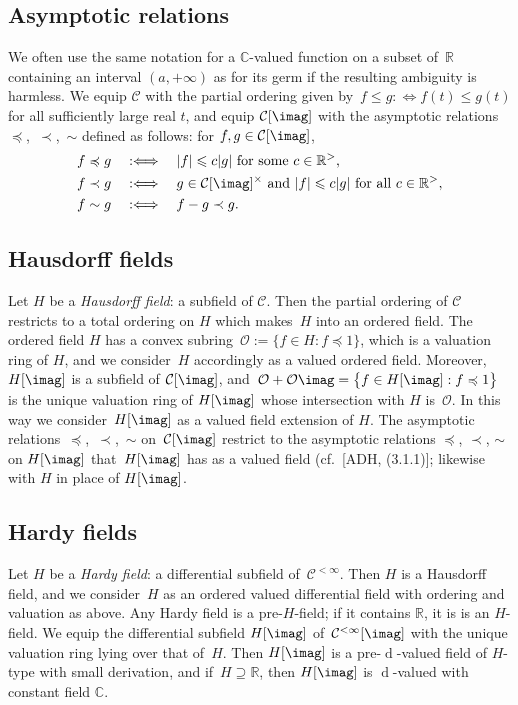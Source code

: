 \documentclass[]{amsart}
\numberwithin{equation}{section}
\newcommand{\bbold}{\mathbb}
\def\R { {\bbold R} }
\def\C { {\bbold C} }
\def\c {\mathcal{C}}
\def \d{\operatorname{d}}
\theoremstyle{definition}
\theoremstyle{remark}
\newcommand{\abs}[1]{\lvert#1\rvert}
\renewcommand\leq{\leqslant}
\renewcommand\preceq{\preccurlyeq}
\renewcommand\le{\leq}
\def \Gi{\mathcal{C}^{<\infty}}
\def \Calinf{\mathcal{C}^{<\infty}}
\begin{document}
\subsection*{Asymptotic relations}
We often use the same notation for a $\C$-valued function 
on a subset of~$\R$ containing an interval $(a, +\infty)$   as for its germ if the resulting ambiguity is harmless.
We equip $\c$ with the partial ordering given by~$f\leq g:\Leftrightarrow f(t)\leq g(t)$ for all sufficiently large real $t$,
and equip $\c[\imag]$ with the asymptotic relations~$\preceq$,~$\prec$,~$\sim$ defined as follows: for $f,g\in \c[\imag]$,
\begin{align*} f\preceq g\quad &:\Longleftrightarrow\quad \text{$|f|\le c|g|$ for some  $c\in \R^{>}$,}\\
f\prec g\quad &:\Longleftrightarrow\quad   \text{$g\in \c[\imag]^\times$ and $\abs{f}\leq c\abs{g}$ for all $c\in\R^>$},\\
f\sim g\quad &:\Longleftrightarrow\quad   f-g\prec g.
\end{align*}

\subsection*{Hausdorff fields}
Let   $H$ be a {\it Hausdorff field}\/:
a subfield of $\mathcal C$. 
Then the partial ordering of $\c$ restricts to a total ordering on $H$ which makes~$H$ into an ordered field.
The ordered field $H$ has a convex subring~${\mathcal{O}:=\{f\in H:f\preceq 1\}}$,
which is a valuation ring of $H$, and we
consider~$H$ accordingly as a valued ordered field. 
Moreover, $H[\imag]$ is a subfield of $\c[\imag]$, and~$\mathcal{O}+\mathcal{O}\imag = \big\{f\in H[\imag]: {f\preceq 1}\big\}$ is the unique valuation ring of $H[\imag]$ whose intersection with $H$ is~$\mathcal{O}$. In this way we consider~$H[\imag]$ as a valued field extension of $H$. 
The asymptotic relations~$\preceq$,~$\prec$,~$\sim$ on~$\c[\imag]$
restrict to the asymptotic relations $\preceq$, $\prec$, $\sim$ on $H[\imag]$ that~$H[\imag]$ has as a valued field (cf.~[ADH, (3.1.1)]; likewise with $H$ in place of $H[\imag]$. 


\subsection*{Hardy fields}
Let $H$ be a {\it Hardy field}\/:  a   differential subfield of~$\Gi$.   Then $H$ is a Hausdorff field, and
we consider~$H$  as an ordered valued differential field with ordering and valuation as above.
Any Hardy field is a pre-$H$-field; if it contains $\R$, it is is an $H$-field.
We   equip the differential subfield $H[\imag]$  of~$\Calinf[\imag]$ with the unique valuation ring 
lying over that of~$H$. Then $H[\imag]$ is a pre-$\d$-valued field of $H$-type with small derivation, and
if~$H\supseteq\R$, then $H[\imag]$ is $\d$-valued   with constant field $\C$.
\end{document}
